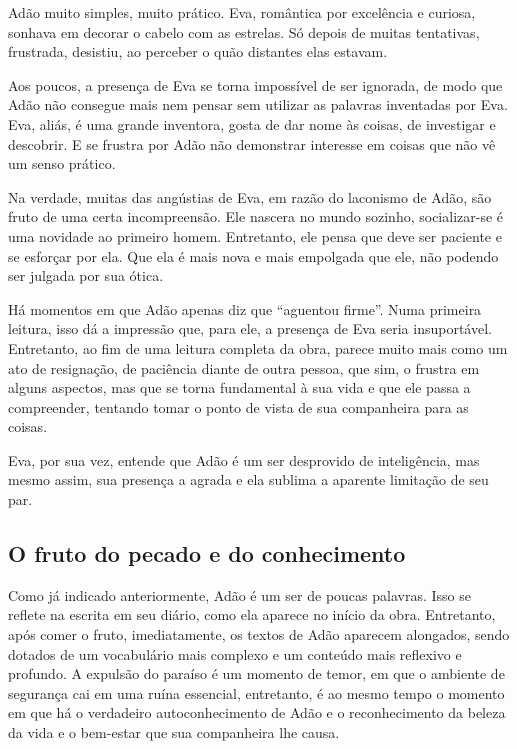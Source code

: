 \documentclass[12pt]{extarticle}
\begin{document}
Adão muito simples, muito prático. Eva, romântica por excelência e
curiosa, sonhava em decorar o cabelo com as estrelas. Só depois de
muitas tentativas, frustrada, desistiu, ao perceber o quão distantes
elas estavam.

Aos poucos, a presença de Eva se torna impossível de ser ignorada, de
modo que Adão não consegue mais nem pensar sem utilizar as palavras
inventadas por Eva. Eva, aliás, é uma grande inventora, gosta de dar
nome às coisas, de investigar e descobrir. E se frustra por Adão não
demonstrar interesse em coisas que não vê um senso prático.

Na verdade, muitas das angústias de Eva, em razão do laconismo de Adão,
são fruto de uma certa incompreensão. Ele nascera no mundo sozinho,
socializar-se é uma novidade ao primeiro homem. Entretanto, ele pensa
que deve ser paciente e se esforçar por ela. Que ela é mais nova e mais
empolgada que ele, não podendo ser julgada por sua ótica.

Há momentos em que Adão apenas diz que ``aguentou firme''. Numa primeira
leitura, isso dá a impressão que, para ele, a presença de Eva seria
insuportável. Entretanto, ao fim de uma leitura completa da obra, parece
muito mais como um ato de resignação, de paciência diante de outra
pessoa, que sim, o frustra em alguns aspectos, mas que se torna
fundamental à sua vida e que ele passa a compreender, tentando tomar o
ponto de vista de sua companheira para as coisas.

Eva, por sua vez, entende que Adão é um ser desprovido de inteligência,
mas mesmo assim, sua presença a agrada e ela sublima a aparente
limitação de seu par.


\subsection{O fruto do pecado e do conhecimento}

Como já indicado anteriormente, Adão é um ser de poucas palavras. Isso
se reflete na escrita em seu diário, como ela aparece no início da obra.
Entretanto, após comer o fruto, imediatamente, os textos de Adão
aparecem alongados, sendo dotados de um vocabulário mais complexo e um
conteúdo mais reflexivo e profundo. A expulsão do paraíso é um momento
de temor, em que o ambiente de segurança cai em uma ruína essencial,
entretanto, é ao mesmo tempo o momento em que há o verdadeiro
autoconhecimento de Adão e o reconhecimento da beleza da vida e o
bem-estar que sua companheira lhe causa.
\end{document}
